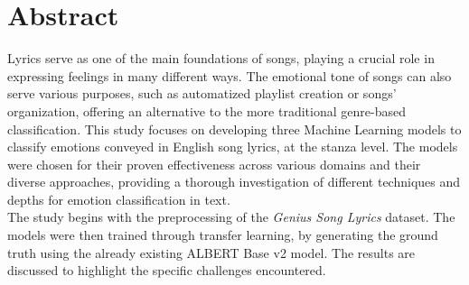 \firstchapter
\chapter*{Abstract}
\label{ch:abstract}
Lyrics serve as one of the main foundations of songs, playing a crucial role in
expressing feelings in many different ways.
The emotional tone of songs can also serve various purposes, such as automatized playlist creation or songs' organization,
offering an alternative to the more traditional genre-based classification. This study focuses on developing three Machine Learning models
to classify emotions conveyed in English song lyrics, at the stanza level.
The models were chosen for their proven effectiveness across various domains and
their diverse approaches, providing a thorough investigation of different
techniques and depths for emotion classification in text.\\
The study begins with the preprocessing of the \textit{Genius Song Lyrics}\textsuperscript{\cite{geniusdataset}} dataset.
The models were then trained through transfer learning, by generating the ground
truth using the already existing ALBERT Base v2 model.
The results are discussed to highlight the specific challenges encountered.
